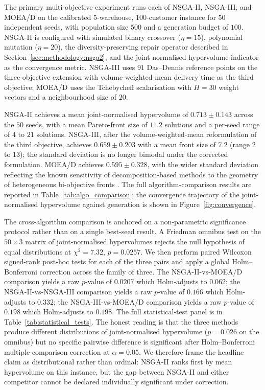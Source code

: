 \documentclass[review,preprint,authoryear,12pt]{elsarticle}
\begin{document}
The primary multi-objective experiment runs each of NSGA-II,
NSGA-III, and MOEA/D on the calibrated 5-warehouse, 100-customer
instance for $50$ independent seeds, with population size $500$ and
a generation budget of $100$. NSGA-II is configured with simulated
binary crossover ($\eta = 15$), polynomial mutation ($\eta = 20$),
the diversity-preserving repair operator described in
Section~\ref{sec:methodology:nsga2}, and the joint-normalised
hypervolume indicator as the convergence metric. NSGA-III uses $91$
Das--Dennis reference points \citep{dasdennis1998nbi} on the
three-objective extension with volume-weighted-mean delivery time as
the third objective; MOEA/D \citep{zhang2007moead} uses the
Tchebycheff scalarisation with $H = 30$ weight vectors and a
neighbourhood size of $20$.

NSGA-II achieves a mean joint-normalised hypervolume of
$0.713 \pm 0.143$ across the $50$ seeds, with a mean Pareto-front
size of $11.2$ solutions and a per-seed range of $4$ to $21$
solutions. NSGA-III, after the volume-weighted-mean reformulation of
the third objective, achieves $0.659 \pm 0.203$ with a mean front
size of $7.2$ (range $2$ to $13$); the standard deviation is no
longer bimodal under the corrected formulation. MOEA/D achieves
$0.595 \pm 0.328$, with the wider standard deviation reflecting the
known sensitivity of decomposition-based methods to the geometry of
heterogeneous bi-objective fronts \citep{li2024moead_survey,
zhang2007moead}. The full algorithm-comparison results are reported
in Table~\ref{tab:algo_comparison}; the convergence trajectory of the
joint-normalised hypervolume against generation is shown in
Figure~\ref{fig:convergence}.

The cross-algorithm comparison is anchored on a non-parametric
significance protocol rather than on a single best-seed result. A
Friedman omnibus test \citep{deb2001moo_book} on the $50 \times 3$
matrix of joint-normalised hypervolumes rejects the null hypothesis
of equal distributions at $\chi^2 = 7.32$, $p = 0.0257$. We then
perform paired Wilcoxon signed-rank post-hoc tests for each of the
three pairs and apply a global Holm--Bonferroni correction across
the family of three. The NSGA-II-vs-MOEA/D comparison yields a raw
$p$-value of $0.0207$ which Holm-adjusts to $0.062$; the
NSGA-II-vs-NSGA-III comparison yields a raw $p$-value of $0.166$
which Holm-adjusts to $0.332$; the NSGA-III-vs-MOEA/D comparison
yields a raw $p$-value of $0.198$ which Holm-adjusts to $0.198$. The
full statistical-test panel is in Table~\ref{tab:statistical_tests}.
The honest reading is that the three methods produce different
distributions of joint-normalised hypervolume ($p = 0.026$ on the
omnibus) but no specific pairwise difference is significant after
Holm--Bonferroni multiple-comparison correction at $\alpha = 0.05$.
We therefore frame the headline claim as distributional rather than
ordinal: NSGA-II ranks first by mean hypervolume on this instance,
but the gap between NSGA-II and either competitor cannot be declared
individually significant under correction.
\end{document}
